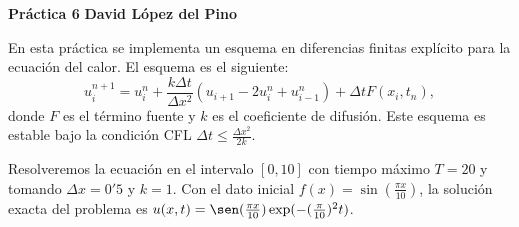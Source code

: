 \documentclass[a4paper, 12pt, oneside]{report}
\begin{document}
\noindent \textbf{Práctica 6} \hfill \textbf{David López del Pino}

\hfill

En esta práctica se implementa un esquema en diferencias finitas explícito para la ecuación del calor. El esquema es el siguiente:
\[u_i^{n+1} = u_i^n + \frac{k\Delta t}{\Delta x^2}(u_{i+1}-2u_i^n + u_{i-1}^n) + \Delta t F(x_i, t_n),\]
donde $F$ es el término fuente y $k$ es el coeficiente de difusión. Este esquema es estable bajo la condición CFL $\Delta t \leq \frac{\Delta x^2}{2k}$.

Resolveremos la ecuación en el intervalo $[0,10]$ con tiempo máximo $T = 20$ y tomando $\Delta x = 0'5$ y $k = 1$. Con el dato inicial $f(x) = \sin(\frac{\pi x}{10})$, la solución exacta del problema es $u(x,t) = \sen(\frac{\pi x}{10})\exp(-(\frac{\pi}{10})^2t)$. 
\end{document}
